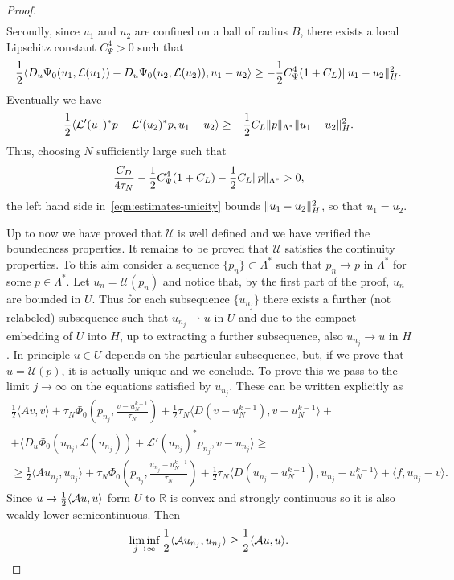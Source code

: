 \documentclass[a4paper,10pt,twoside]{amsbook}
\numberwithin{section}{chapter}
\numberwithin{equation}{chapter}
\theoremstyle{definition}
\DeclarePairedDelimiter{\norm}{\lVert}{\rVert}
\DeclarePairedDelimiter{\dual}{\langle}{\rangle}
\begin{document}
\begin{proof}
\[\begin{multlined}
\end{multlined}
\]
Secondly, since $u_1$ and $u_2$ are confined on a ball of radius $B$, there exists a local Lipschitz constant $C_\Psi^4>0$ such that
\[
\frac{1}{2}\langle D_u\Psi_0(u_1,\mathcal{L}(u_1))-D_u\Psi_0(u_2,\mathcal{L}(u_2)),u_1-u_2\rangle\ge-\frac{1}{2}C_\Psi^4(1+C_L)\norm{u_1-u_2}_H^2.
\]
Eventually we have
\[
\frac{1}{2}\langle\mathcal{L}'(u_1)^*p-\mathcal{L}'(u_2)^*p,u_1-u_2\rangle\ge-\frac{1}{2}C_L\norm{p}_{\Lambda^*}\norm{u_1-u_2}_H^2.
\]
Thus, choosing $N$ sufficiently large such that
\[
\frac{C_D}{4\tau_N}-\frac{1}{2}C_\Psi^4(1+C_L)-\frac{1}{2}C_L\norm{p}_{\Lambda^*}>0,
\]
the left hand side in~\eqref{eqn:estimates-unicity} bounds $\norm{u_1-u_2}_H^2$, so that $u_1=u_2$.

Up to now we have proved that $\mathcal{U}$ is well defined and we have verified the boundedness properties. It remains to be proved that $\mathcal{U}$ satisfies the continuity properties. To this aim consider a sequence $\{p_n\}\subset\Lambda^*$ such that $p_n\to p$ in $\Lambda^*$ for some $p\in\Lambda^*$. Let $u_n=\mathcal{U}(p_n)$ and notice that, by the first part of the proof, $u_n$ are bounded in $U$. Thus for each subsequence $\{u_{n_j}\}$ there exists a further (not relabeled) subsequence such that $u_{n_j}\rightharpoonup u$ in $U$ and due to the compact embedding of $U$ into $H$, up to extracting a further subsequence, also $u_{n_j}\to u$ in $H$. In principle $u\in U$ depends on the particular subsequence, but, if we prove that $u=\mathcal{U}(p)$, it is actually unique and we conclude. To prove this we pass to the limit $j\to\infty$ on the equations satisfied by $u_{n_j}$. These can be written explicitly as
\[
\begin{multlined}
\frac{1}{2}\langle Av,v\rangle+\tau_N\Phi_0\left(p_{n_j},\frac{v-u_N^{k-1}}{\tau_N}\right)+\frac{1}{2}\tau_N\langle D(v-u_N^{k-1}),v-u_N^{k-1}\rangle+\\
+\langle D_u\Phi_0(u_{n_j},\mathcal{L}(u_{n_j}))+\mathcal{L}'(u_{n_j})^*p_{n_j},v-u_{n_j}\rangle\ge\\
\ge\frac{1}{2}\langle Au_{n_j},u_{n_j}\rangle+\tau_N\Phi_0\left(p_{n_j},\frac{u_{n_j}-u_N^{k-1}}{\tau_N}\right)+\frac{1}{2}\tau_N\langle D(u_{n_j}-u_N^{k-1}),u_{n_j}-u_N^{k-1}\rangle+\langle f,u_{n_j}-v\rangle.
\end{multlined}
\]
Since $u\mapsto\frac{1}{2}\dual{\mathcal{A}u,u}$ form $U$ to $\mathbb{R}$ is convex and strongly continuous so it is also weakly lower semicontinuous. Then
\[
\liminf_{j\to\infty}\frac{1}{2}\dual{\mathcal{A}u_{n_j},u_{n_j}}\ge\frac{1}{2}\dual{\mathcal{A}u,u}.
\]
\end{proof}
\end{document}
